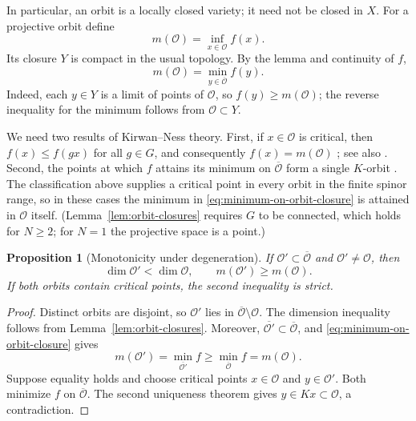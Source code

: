\documentclass{article}
\newtheorem{proposition}[theorem]{Proposition}
\theoremstyle{definition}
\theoremstyle{remark}
\begin{document}
In particular, an orbit is a locally closed variety; it need not be
closed in $X$. For a projective orbit define
\begin{equation}
 m(\mathcal O)=\inf_{x\in\mathcal O}f(x).
\end{equation}
Its closure $Y$ is compact in the usual topology. By the lemma and
continuity of $f$,
\begin{equation}
 m(\mathcal O)=\min_{y\in\overline{\mathcal O}}f(y).
 \label{eq:minimum-on-orbit-closure}
\end{equation}
Indeed, each $y\in Y$ is a limit of points of $\mathcal O$, so
$f(y)\ge m(\mathcal O)$; the reverse inequality for the minimum
follows from $\mathcal O\subset Y$.

We need two results of Kirwan--Ness theory. First, if $x\in\mathcal O$
is critical, then $f(x)\le f(gx)$ for all $g\in G$, and consequently
$f(x)=m(\mathcal O)$ \cite[Theorem~6.2]{Ness1984}; see also
\cite[Corollary~6.2]{GeorgoulasRobbinSalamon2021}.
Second, the points at which $f$ attains its minimum on
$\overline{\mathcal O}$ form a single $K$-orbit
\cite[Theorem~6.5]{GeorgoulasRobbinSalamon2021}.
The classification above supplies a critical point in every orbit in
the finite spinor range, so in these cases the minimum in
\eqref{eq:minimum-on-orbit-closure} is attained in $\mathcal O$ itself.
(Lemma~\ref{lem:orbit-closures} requires $G$ to be connected, which
holds for $N\ge2$; for $N=1$ the projective space is a point.)

\begin{proposition}[Monotonicity under degeneration]
\label{prop:momentum-degeneration}
If $\mathcal O'\subset\overline{\mathcal O}$ and
$\mathcal O'\ne\mathcal O$, then
\begin{equation}
 \dim\mathcal O'<\dim\mathcal O,\qquad
 m(\mathcal O')\ge m(\mathcal O).
 \label{eq:degeneration-dimension-momentum}
\end{equation}
If both orbits contain critical points, the second inequality is strict.
\end{proposition}

\begin{proof}
Distinct orbits are disjoint, so $\mathcal O'$ lies in
$\overline{\mathcal O}\setminus\mathcal O$. The dimension inequality
follows from Lemma~\ref{lem:orbit-closures}. Moreover,
$\overline{\mathcal O'}\subset\overline{\mathcal O}$, and
\eqref{eq:minimum-on-orbit-closure} gives
\begin{equation}
 m(\mathcal O')=\min_{\overline{\mathcal O'}}f
       \ge\min_{\overline{\mathcal O}}f=m(\mathcal O).
\end{equation}
Suppose equality holds and choose critical points $x\in\mathcal O$
and $y\in\mathcal O'$. Both minimize $f$ on
$\overline{\mathcal O}$. The second uniqueness theorem gives
$y\in Kx\subset\mathcal O$, a contradiction.
\end{proof}
\end{document}
